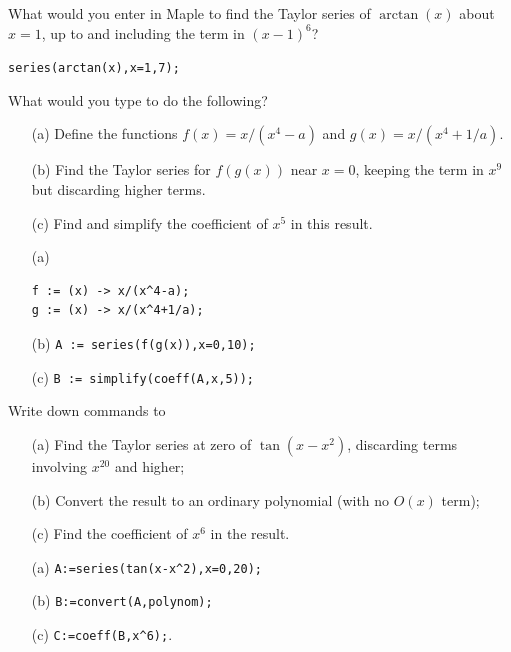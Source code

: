 \documentclass[a4paper]{article}
\begin{document}
\begin{problem}
 What would you enter in Maple to find the Taylor series of
 $\arctan(x)$ about $x=1$, up to and including the term in
 $(x-1)^6$? 
\end{problem}
\begin{solution}
 \verb~series(arctan(x),x=1,7);~ 
\end{solution}

\begin{problem}
 What would you type to do the following?
 \begin{itemize}
  \item[(a)] Define the functions $f(x)=x/(x^4-a)$ and
   $g(x)=x/(x^4+1/a)$. 
  \item[(b)] Find the Taylor series for $f(g(x))$ near $x=0$, keeping
   the term in $x^9$ but discarding higher terms. 
  \item[(c)] Find and simplify the coefficient of $x^5$ in this
   result.  
 \end{itemize}
\end{problem}
\begin{solution}
 \begin{itemize}
  \item[(a)] 
\begin{verbatim}
f := (x) -> x/(x^4-a);
g := (x) -> x/(x^4+1/a);
\end{verbatim}
  \item[(b)] \verb~A := series(f(g(x)),x=0,10);~ 
  \item[(c)] \verb~B := simplify(coeff(A,x,5));~ 
 \end{itemize}
\end{solution}

\begin{problem}
 Write down commands to
 \begin{itemize}
  \item[(a)] Find the Taylor series at zero of $\tan(x-x^2)$, 
   discarding terms involving $x^{20}$ and higher; 
  \item[(b)] Convert the result to an ordinary polynomial
   (with no $O(x)$ term); 
  \item[(c)] Find the coefficient of $x^{6}$ in the
   result.  
 \end{itemize}
\end{problem}
\begin{solution}
 \begin{itemize}
  \item[(a)] \verb~A:=series(tan(x-x^2),x=0,20);~  
  \item[(b)] \verb~B:=convert(A,polynom);~ 
  \item[(c)] \verb~C:=coeff(B,x^6);~.  \mk
 \end{itemize}
\end{solution}
\end{document}
